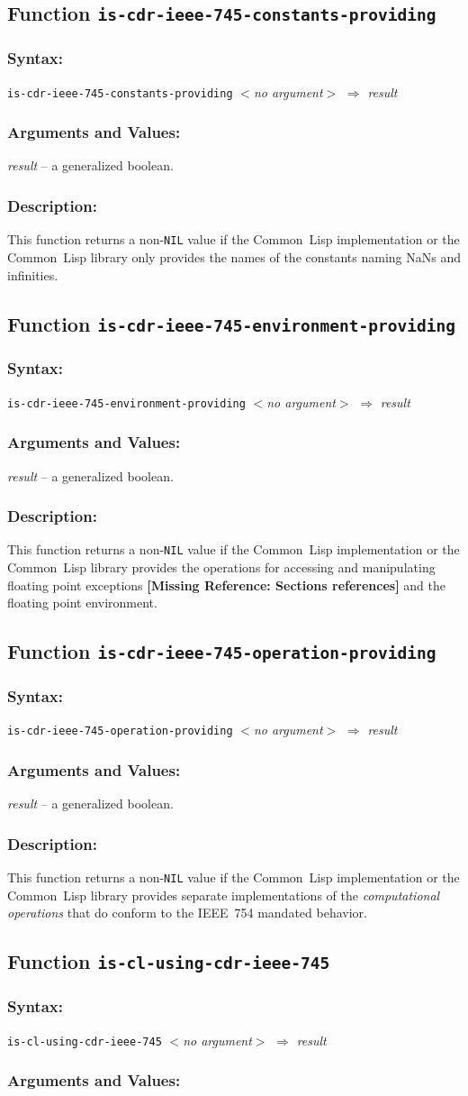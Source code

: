 \documentclass[10pt,fleqn]{article}
\newcommand{\CL}{\textsf{Common~Lisp}}
\newcommand{\checkref}[1]{{\textbf{[Missing Reference: #1]}}}
\newcommand{\code}[1]{\texttt{#1}}
\newcommand{\varname}[1]{\textit{#1}}
\newcommand{\DDictionaryItem}[1]{\vspace*{6pt}\noindent\hrulefill\vspace*{-9pt}\subsection*{#1}}
\newcommand{\DSyntax}{\subsubsection*{Syntax:}}
\newcommand{\DArgsNValues}{\subsubsection*{Arguments and Values:}}
\newcommand{\DDescription}{\subsubsection*{Description:}}
\begin{document}
\DDictionaryItem{Function \code{is-cdr-ieee-745-constants-providing}}

\DSyntax{}

\code{is-cdr-ieee-745-constants-providing} \varname{$<$no argument$>$}
$\Rightarrow$ \varname{result}

\DArgsNValues{}

\varname{result} -- a generalized boolean.

\DDescription{}

This function returns a non-\code{NIL} value if the \CL{}
implementation or the \CL{} library only provides the names of the
constants naming NaNs and infinities.


\DDictionaryItem{Function \code{is-cdr-ieee-745-environment-providing}}

\DSyntax{}

\code{is-cdr-ieee-745-environment-providing} \varname{$<$no argument$>$}
$\Rightarrow$ \varname{result}

\DArgsNValues{}

\varname{result} -- a generalized boolean.

\DDescription{}

This function returns a non-\code{NIL} value if the \CL{}
implementation or the \CL{} library provides the operations for
accessing and manipulating floating point exceptions
\checkref{Sections references} and the floating
point environment.


\DDictionaryItem{Function \code{is-cdr-ieee-745-operation-providing}}

\DSyntax{}

\code{is-cdr-ieee-745-operation-providing} \varname{$<$no argument$>$}
$\Rightarrow$ \varname{result}

\DArgsNValues{}

\varname{result} -- a generalized boolean.


\DDescription{}

This function returns a non-\code{NIL} value if the \CL{}
implementation or the \CL{} library provides separate implementations
of the \emph{computational operations} that do conform to the IEEE~754
mandated behavior.


\DDictionaryItem{Function \code{is-cl-using-cdr-ieee-745}}

\DSyntax{}

\code{is-cl-using-cdr-ieee-745} \varname{$<$no argument$>$}
$\Rightarrow$ \varname{result}

\DArgsNValues{}
\end{document}
